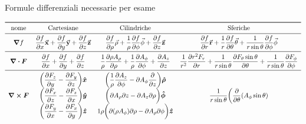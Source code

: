 \documentclass[a4paper]{scrarticle}
\begin{document}
\pagebreak

\begin{sidewaystable}
\caption{Formule differenziali necessarie per esame}
    \[
\begin{array}{cccc}
    \toprule
    \text{nome} & \text{Cartesiane} & \text{Cilindriche} & \text{Sferiche}\\
\midrule
\displaystyle \grad{f} & 
    \displaystyle \pdv{f}{x} \va x + \pdv{f}{y} \va y + \pdv{f}{z} \va z &
    \displaystyle \pdv{f}{\rho}\va \rho + \frac{1}{\rho}\pdv{f}{\phi}\va \phi + \pdv{f}{z} \va z &
    \displaystyle \pdv{f}{r} \va r + \frac{1}{r} \pdv{f}{\theta} \va \theta + \frac{1}{r\sin{\theta}} \pdv{f}{\phi} \va \phi\\ 
\midrule
\displaystyle \div{\bm{F}} &
    \displaystyle \pdv{f}{x} + \pdv{f}{y} + \pdv{f}{z} &
    \displaystyle \frac{1}{\rho} \pdv{ \rho A_\rho } { \rho}
    + \frac{1} {\rho}\pdv {A_\phi} {\phi}
    + \pdv{ A_z} {z}&
    \displaystyle \frac{1}{r^2} \pdv{r^2 F_r}{r} + \frac{1}{r \sin \theta} \pdv{F_{\theta} \sin \theta}{\theta} + \frac{1}{ r \sin \theta}\pdv{F_{\phi}}{\phi}\\ 
\midrule
\displaystyle \curl{\bm{F}} & 
\begin{matrix}
    \displaystyle \bigg(\pdv{F_z}{y} - \pdv{F_y}{z} \bigg) \boldsymbol{\hat x}\\
    \displaystyle \bigg(\pdv{F_x}{z} - \pdv{F_z}{x}\bigg) \boldsymbol{\hat y}\\
    \displaystyle \bigg(\pdv{F_y}{x} - \pdv{F_x}{y}\bigg) \boldsymbol{\hat z}
\end{matrix} & 
\begin{matrix}
    \displaystyle \bigg (\frac{1 }{ \rho}\pdv{ A_z }{ \phi}
    - {\partial A_\phi } \pdv{  z} \bigg ) \boldsymbol{\hat \rho}  \\
    \displaystyle \bigg ({\partial A_\rho }{ \partial z} - {\partial A_z }{ \partial \rho} \bigg) \boldsymbol{\hat \phi} \\
    \displaystyle{1 }{ \rho}\bigg ({\partial ( \rho A_\phi ) }{ \partial \rho}
    - {\partial A_\rho }{ \partial \phi} \bigg ) \boldsymbol{\hat z}
\end{matrix} &
\begin{matrix}
    \displaystyle \frac{1 }{ r\sin\theta} \bigg (\frac{\partial }{ \partial \theta} ( A_\phi\sin\theta )

\end{matrix}
\end{array}\]
\end{sidewaystable}
\end{document}
